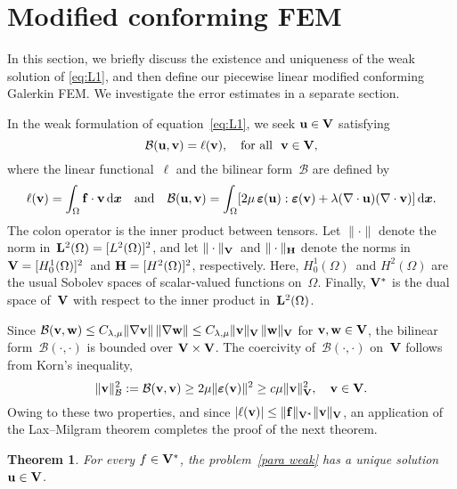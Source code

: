 \documentclass[11pt]{article}
\newcommand{\calB}{\mathcal{B}}
\newcommand{\vf}{{\bf f}}
\newcommand{\vu}{{\bf u}}
\newcommand{\vv}{{\bf v}}
\newcommand{\vV}{{\bf V}}
\newcommand{\vw}{{\bf w}}
\newcommand{\bsx}{{\boldsymbol{x}}}
\numberwithin{equation}{section}
\newcommand{\veps}{{\boldsymbol{\varepsilon}}}
\newcommand{\ud}{\mathrm{d}}
\newtheorem{theorem}{Theorem}[section]
\begin{document}
\section{Modified  conforming FEM}\label{Sec: FEM}
In this section, we briefly discuss the existence and uniqueness of the weak solution of \eqref{eq:L1}, and then define our piecewise linear modified conforming Galerkin FEM. We investigate the error estimates in a separate section.  

In the weak formulation of  equation~\eqref{eq:L1}, we seek $\vu \in \vV$ satisfying
\begin{equation}\label{para weak}
 \calB(\vu, \vv) = \ell(\vv), \quad \text{for all~~$\vv \in \vV$,}
\end{equation}
where the linear functional~$\ell$ and the bilinear form~$\calB$ are defined by
\begin{equation*}\label{eq: bilinear}
\ell(\vv) = \int_\Omega \vf \cdot \vv \,\ud\bsx 
 \quad\text{and}\quad
\calB(\vu,\vv)=\int_\Omega[2\mu\,\veps(\vu):\veps(\vv)+\lambda(\nabla\cdot\vu)(\nabla\cdot\vv)]\,\ud\bsx.
\end{equation*}
The colon operator is the inner product between tensors.  Let $\|\cdot\|$ denote the norm 
in~${\bf L}^2(\Omega)=[L^2(\Omega)]^2$, and let $\|\cdot\|_{\bf V}$~and $\|\cdot\|_{\bf H}$ denote the 
norms in $\vV=[H^1_0(\Omega)]^2$~and ${\bf H}=[H^2(\Omega)]^2$, respectively. Here, $H^1_0(\Omega)$~and 
$H^2(\Omega)$ are the usual Sobolev spaces of scalar-valued functions on~$\Omega$.  Finally, $\vV^*$ is the 
dual space of~$\vV$ with respect to the inner product in~${\bf L}^2(\Omega)$. 
 
Since $\calB(\vv,\vw) \le C_{\lambda,\mu}\|\nabla \vv\|\,\|\nabla \vw\|
\le C_{\lambda,\mu}\| \vv\|_{\vV}\,\|\vw\|_{\vV}$ for $\vv,\vw \in \vV$, the bilinear 
form~$\calB(\cdot,\cdot)$ is bounded over $\vV \times \vV$. The coercivity of~$\calB(\cdot,\cdot)$ 
on~$\vV$ follows from Korn's inequality,
\begin{equation}\label{eq: coer B}
\|\vv\|_\calB^2:=\calB(\vv,\vv)\ge  2 \mu\|\veps(\vv)\|^2 \ge c \mu \| \vv\|_{\vV}^2, 
\quad \vv \in \vV.
\end{equation}
Owing to these two properties, and since $|\ell(\vv)|\le \|\vf\|_{\vV^*}\|\vv\|_{\vV}$,  an application of 
the Lax--Milgram theorem completes the proof of the next theorem.   

\begin{theorem}\label{thm: unique solution}
For every $f \in \vV^*$, the problem~\eqref{para weak} has a unique solution~$\vu\in\vV$. 
\end{theorem}
\end{document}

